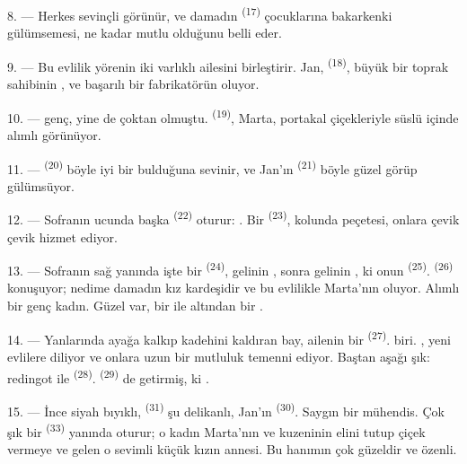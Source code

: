 \VUsaut{3.0mm}

8. --- Herkes sevinçli görünür, ve damadın 
\textsuperscript{(17)} çocuklarına bakarkenki gülümsemesi, ne kadar mutlu
olduğunu belli eder.

9. --- Bu evlilik yörenin iki varlıklı ailesini birleştirir. Jan,
 \textsuperscript{(18)}, büyük bir toprak sahibinin
, ve başarılı bir fabrikatörün  oluyor.

10. ---  genç, yine de  çoktan olmuştu.
 \textsuperscript{(19)}, Marta, portakal çiçekleriyle süslü
 içinde alımlı görünüyor.

11. ---  \textsuperscript{(20)} böyle iyi bir
 bulduğuna sevinir, ve Jan'ın 
\textsuperscript{(21)}  böyle güzel görüp gülümsüyor.

12. --- Sofranın ucunda başka  \textsuperscript{(22)} oturur:
. Bir 
\textsuperscript{(23)}, kolunda peçetesi, onlara çevik çevik hizmet ediyor.

\VUsaut{3.0mm}

13. --- Sofranın sağ yanında işte bir 
\textsuperscript{(24)}, gelinin , sonra gelinin
, ki onun  \textsuperscript{(25)}.
 \textsuperscript{(26)} konuşuyor; nedime damadın kız
kardeşidir ve bu evlilikle Marta'nın  oluyor. Alımlı bir
genç kadın. Güzel  var, bir  ile
altından bir .

14. --- Yanlarında ayağa kalkıp kadehini kaldıran bay, ailenin bir
 \textsuperscript{(27)}. 
biri. , yeni evlilere  diliyor ve onlara
uzun bir mutluluk temenni ediyor. Baştan aşağı şık: redingot ile
 \textsuperscript{(28)}. 
\textsuperscript{(29)} de getirmiş, ki .

15. --- İnce siyah bıyıklı,  \textsuperscript{(31)} şu
delikanlı, Jan'ın  \textsuperscript{(30)}. Saygın bir
mühendis. Çok şık bir  \textsuperscript{(33)} yanında
oturur; o kadın Marta'nın  ve kuzeninin elini tutup çiçek
vermeye ve   gelen o sevimli küçük
kızın annesi. Bu hanımın  çok güzeldir ve
 özenli.

